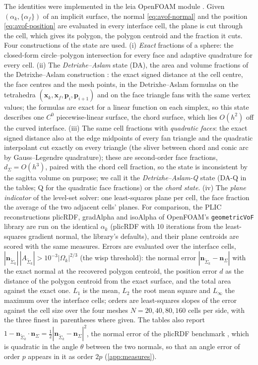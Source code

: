 \documentclass[preprint,12pt]{elsarticle}
\newcommand{\x}{\mathbf{x}}
\newcommand{\n}{\mathbf{n}}
\newcommand{\nSk}{\mathbf{n}_{\tilde{\Sigma}_k}}
\newcommand{\ASk}{A_{\tilde{\Sigma}_k}}
\begin{document}
The identities were implemented in the leia OpenFOAM module \citep{LeiaRepo2026}. Given $(\alpha_k, \{\alpha_f\})$ of an implicit surface, the normal \cref{eq:avof-normal} and the position \cref{eq:avof-position} are evaluated in every interface cell, the plane is cut through the cell, which gives its polygon, the polygon centroid and the fraction it cuts. Four constructions of the state are used. (i) \emph{Exact} fractions of a sphere: the closed-form circle--polygon intersection for every face and adaptive quadrature for every cell. (ii) The \emph{Detrixhe--Aslam} state (DA), the area and volume fractions of the Detrixhe--Aslam construction \citep{DetrixheAslam2016}: the exact signed distance at the cell centre, the face centres and the mesh points, in the Detrixhe--Aslam formulas on the tetrahedra $(\x_k, \x_f, \mathbf{p}_i, \mathbf{p}_{i+1})$ and on the face triangle fans with the same vertex values; the formulas are exact for a linear function on each simplex, so this state describes one $C^0$ piecewise-linear surface, the chord surface, which lies $O(h^2)$ off the curved interface. (iii) The same cell fractions with \emph{quadratic faces}: the exact signed distance also at the edge midpoints of every fan triangle and the quadratic interpolant cut exactly on every triangle (the sliver between chord and conic arc by Gauss--Legendre quadrature); these are second-order face fractions, $d_\Sigma = O(h^3)$, paired with the chord cell fraction, so the state is inconsistent by the sagitta volume on purpose; we call it the \emph{Detrixhe--Aslam-Q} state (DA-Q in the tables; Q for the quadratic face fractions) or the \emph{chord state}. (iv) The \emph{plane indicator} of the level-set solver: one least-squares plane per cell, the face fraction the average of the two adjacent cells' planes. For comparison, the PLIC reconstructions plicRDF, gradAlpha and isoAlpha of OpenFOAM's \texttt{geometricVoF} library \citep{ScheuflerRoenby2019,ScheuflerRoenby2023TwoPhaseFlow} are run on the identical $\alpha_k$ (plicRDF with 10 iterations from the least-squares gradient normal, the library's defaults), and their plane centroids are scored with the same measures. Errors are evaluated over the interface cells, $|\nSk|\,|\ASk| > 10^{-3}|\Omega_k|^{2/3}$ (the wisp threshold): the normal error $|\nSk - \n_\Sigma|$ with the exact normal at the recovered polygon centroid, the position error $d$ as the distance of the polygon centroid from the exact surface, and the total area against the exact one. $L_1$ is the mean, $L_2$ the root mean square and $L_\infty$ the maximum over the interface cells; orders are least-squares slopes of the error against the cell size over the four meshes $N = 20, 40, 80, 160$ cells per side, with the three finest in parentheses where given. The tables also report $1 - \nSk\cdot\n_\Sigma = \tfrac12|\nSk - \n_\Sigma|^2$, the normal error of the plicRDF benchmark \citep{ScheuflerRoenby2019}, which is quadratic in the angle $\theta$ between the two normals, so that an angle error of order $p$ appears in it as order $2p$ (\ref{app:measures}).
\end{document}
